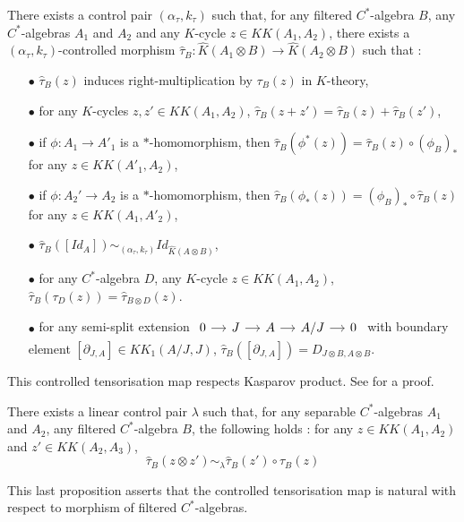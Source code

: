 \begin{thm}\label{tensorization}
There exists a control pair $(\alpha_\tau,k_\tau)$ such that, for any filtered $C^*$-algebra $B$, any $C^*$-algebras $A_1$ and $A_2$ and any $K$-cycle $z\in KK(A_1,A_2)$, there exists a $(\alpha_\tau,k_\tau)$-controlled morphism $\hat \tau_B : \hat K(A_1\otimes B)\rightarrow \hat K(A_2\otimes B)$
such that :
\begin{itemize}
\item[$\bullet$] $\hat \tau_B(z)$ induces right-multiplication by $\tau_B(z)$ in $K$-theory,
\item[$\bullet$] for any $K$-cycles $z,z'\in KK(A_1,A_2)$, $\hat \tau_B(z+z')=\hat\tau_B(z)+\hat\tau_B(z')$,
\item[$\bullet$] if $\phi : A_1\rightarrow A'_1$ is a $*$-homomorphism, then $\hat\tau_B(\phi^*(z)) =  \hat\tau_B(z)\circ (\phi_B)_*$ for any $z\in KK(A'_1,A_2)$,
\item[$\bullet$] if $\phi : A_2'\rightarrow A_2$ is a $*$-homomorphism, then $\hat\tau_B(\phi_*(z)) = (\phi_B)_*\circ \hat\tau_B(z)$ for any $z\in KK(A_1,A'_2)$,
\item[$\bullet$] $\hat \tau_B([Id_A])\sim_{(\alpha_\tau,k_\tau)} Id_{\hat K(A\otimes B)}$,
\item[$\bullet$] for any $C^*$-algebra $D$, any $K$-cycle $z\in KK(A_1,A_2)$, $\hat\tau_B (\tau_D(z))= \hat\tau_{B\otimes D}(z)$.
\item[$\bullet$] for any semi-split extension $\begin{tikzcd}[column sep = small] 0 \arrow{r}& J \arrow{r} & A \arrow{r} & A/J\arrow{r} & 0\end{tikzcd}$ with boundary element $[\partial_{J,A}]\in KK_1(A/J,J)$, $\hat\tau_B([\partial_{J,A}])=D_{J\otimes B,A\otimes B}$.
\end{itemize}
\end{thm}

This controlled tensorisation map respects Kasparov product. See \cite{OY2} for a proof.

\begin{thm}
There exists a linear control pair $\lambda$ such that, for any separable $C^*$-algebras $A_1$ and $A_2$, any filtered $C^*$-algebra $B$, the following holds : for any $z\in KK(A_1,A_2)$ and $z'\in KK(A_2,A_3)$,
\[\hat\tau_B(z\otimes z')\sim_\lambda \hat\tau_B(z')\circ\hat\tau_B(z)\]
\end{thm}

This last proposition asserts that the controlled tensorisation map is natural with respect to morphism of filtered $C^*$-algebras. \cite{OY2}

